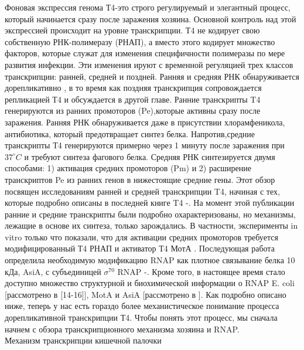 \documentclass[a4paper,12pt]{article}
\begin{document}
        \par{
        Фоновая экспрессия генома Т4-это строго регулируемый и элегантный процесс, который начинается сразу после заражения
        хозяина. Основной контроль над этой экспрессией происходит на уровне транскрипции. Т4 не кодирует свою собственную
        РНК-полимеразу (РНАП), а вместо этого кодирует множество факторов, которые служат для изменения специфичности
        полимеразы по мере развития инфекции. Эти изменения ируют с временной регуляцией трех классов транскрипции:
        ранней, средней и поздней. Ранняя и средняя РНК обнаруживается дорепликативно
        \cite{hinton1,hinton2,hinton3,hinton4,hinton5,hinton6}, в то время как поздняя транскрипция сопровождается
        репликацией Т4 и обсуждается в другой главе. Ранние транскрипты T4 генерируются из ранних промоторов (Pe),которые
        активны сразу после заражения. Ранняя РНК обнаруживается даже в присутствии хлорамфеникола, антибиотика, который
        предотвращает синтез белка. Напротив,средние транскрипты Т4 генерируются примерно через 1 минуту после заражения при
        \(37^\circ C\)  и требуют синтеза фагового белка. Средняя РНК синтезируется двумя способами: 1) активация средних
        промоторов (Pm) и 2) расширение транскриптов Pe из ранних генов в нижестоящие средние гены. Этот обзор посвящен
        исследованиям ранней и средней транскрипции T4, начиная с тех, которые подробно описаны в последней книге T4
        \cite{hinton1}-\cite{hinton5}. На момент этой публикации ранние и средние транскрипты были подробно охарактеризованы,
        но механизмы, лежащие в основе их синтеза, только зарождались. В частности, эксперименты in vitro только что
        показали, что для активации средних промоторов требуется модифицированный Т4 РНАП и активатор Т4 МотА
        \cite{hinton7,hinton8}. Последующая работа определила необходимую модификацию RNAP как плотное связывание белка 10
        кДа, AsiA, с субъединицей \(\sigma^{70}\) RNAP \cite{hinton9}-\cite{hinton13}. Кроме того, в настоящее время стало
        доступно множество структурной и биохимической информации о RNAP E. coli [рассмотрено в [14-16]], MotA и AsiA
        [рассмотрено в \cite{hinton2}]. Как подробно описано ниже, теперь у нас есть гораздо более механистическое понимание
        процесса дорепликативной транскрипции Т4. Чтобы понять этот процесс, мы сначала начнем с обзора транскрипционного
        механизма хозяина и RNAP.} \\ 
    {\Large Механизм транскрипции кишечной палочки }
\end{document}
